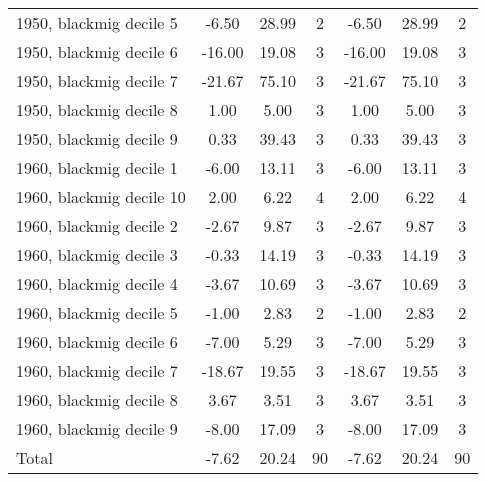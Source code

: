 \begin{table}[htbp]
\begin{tabular}{l*{2}{ccc}}
1950, blackmig decile 5&       -6.50&       28.99&           2&       -6.50&       28.99&           2\\
1950, blackmig decile 6&      -16.00&       19.08&           3&      -16.00&       19.08&           3\\
1950, blackmig decile 7&      -21.67&       75.10&           3&      -21.67&       75.10&           3\\
1950, blackmig decile 8&        1.00&        5.00&           3&        1.00&        5.00&           3\\
1950, blackmig decile 9&        0.33&       39.43&           3&        0.33&       39.43&           3\\
1960, blackmig decile 1&       -6.00&       13.11&           3&       -6.00&       13.11&           3\\
1960, blackmig decile 10&        2.00&        6.22&           4&        2.00&        6.22&           4\\
1960, blackmig decile 2&       -2.67&        9.87&           3&       -2.67&        9.87&           3\\
1960, blackmig decile 3&       -0.33&       14.19&           3&       -0.33&       14.19&           3\\
1960, blackmig decile 4&       -3.67&       10.69&           3&       -3.67&       10.69&           3\\
1960, blackmig decile 5&       -1.00&        2.83&           2&       -1.00&        2.83&           2\\
1960, blackmig decile 6&       -7.00&        5.29&           3&       -7.00&        5.29&           3\\
1960, blackmig decile 7&      -18.67&       19.55&           3&      -18.67&       19.55&           3\\
1960, blackmig decile 8&        3.67&        3.51&           3&        3.67&        3.51&           3\\
1960, blackmig decile 9&       -8.00&       17.09&           3&       -8.00&       17.09&           3\\
Total               &       -7.62&       20.24&          90&       -7.62&       20.24&          90\\
\bottomrule
\end{tabular}
\end{table}
